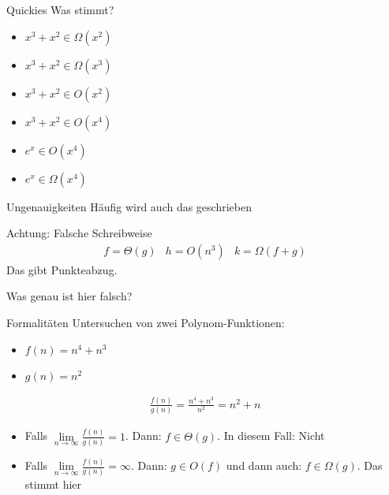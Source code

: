 \begin{frame}{Quickies}
   Was stimmt?
   \begin{itemize}
       \item $x^3 + x^2 \in \Omega\left( x^2 \right)$ 
       \item $x^3 + x^2 \in \Omega\left( x^3 \right)$ 
       \item $x^3 + x^2 \in O\left( x^2 \right)$ 
       \item $x^3 + x^2 \in O\left( x^4 \right)$ 
       \item $e^x \in O\left( x^4 \right)$ 
       \item $e^x \in \Omega\left( x^4 \right)$ 
   \end{itemize}
\end{frame}
\begin{frame}{Ungenauigkeiten}
    Häufig wird auch das geschrieben
    \begin{alertblock}{Achtung: Falsche Schreibweise}
        \begin{align*}
            f = \Theta\left( g \right) & h = O\left( n^3 \right) & k = \Omega\left( f + g \right)
        \end{align*}
        Das gibt Punkteabzug.
    \end{alertblock}
    Was genau ist hier falsch?\\
\end{frame}
\begin{frame}{Formalitäten}
    Untersuchen von zwei Polynom-Funktionen:
    \begin{itemize}
        \item $f\left( n \right) = n^4 + n^3$
        \item $g\left( n \right) = n^2$
    \end{itemize}
    \hline
    \begin{align*}
        \frac{f\left( n \right)}{g\left( n \right)} = \frac{n^4+n^3}{n^2} = n^2 + n
    \end{align*}
    \hline
    \begin{itemize}
        \item Falls $\lim\limits_{n\rightarrow \infty}{\frac{f\left( n \right)}{g\left( n \right)}} = 1$. Dann: $f \in \Theta\left( g \right)$. In diesem Fall: Nicht
        \item Falls $\lim\limits_{n\rightarrow \infty}{\frac{f\left( n \right)}{g\left( n \right)}} = \infty$. Dann: $g \in O\left( f \right)$ und dann auch: $f \in \Omega\left( g \right)$. Das stimmt hier
    \end{itemize}
\end{frame}
